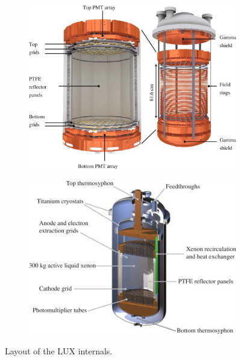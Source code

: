 \begin{figure}[!h]
\centering
\begin{subfigure}{0.5\linewidth}
\centering
\includegraphics[width=\linewidth]{Figures/lux_internals.jpg}
\caption{}
\end{subfigure}%
\begin{subfigure}{0.5\linewidth}
\centering
\includegraphics[width=\linewidth]{Figures/lux_layout.jpg}
\caption{}
\end{subfigure}
\caption{Layout of the LUX internals.\cite{lux2012}}
\label{fig:lux_layout} 
\end{figure}

